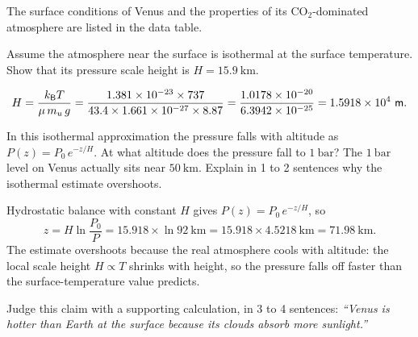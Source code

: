 
The surface conditions of Venus and the properties of its $\mathrm{CO_2}$-dominated atmosphere are listed in the data table.

\parti {} Assume the atmosphere near the surface is isothermal at the surface temperature.
Show that its pressure scale height is $H = 15.9\ \mathrm{km}$.

\begin{solution}
\[
  H = \frac{k_{\mathsf{B}} T}{\mu\, m_u\, g}
    = \frac{1.381 \times 10^{-23} \times 737}{43.4 \times 1.661 \times 10^{-27} \times 8.87}
    = \frac{1.0178 \times 10^{-20}}{6.3942 \times 10^{-25}}
    = 1.5918 \times 10^{4}\ \mathsf{m}.
\]
\end{solution}

\parti {} In this isothermal approximation the pressure falls with altitude as $P(z) = P_0\, e^{-z/H}$.
At what altitude does the pressure fall to $1\ \mathrm{bar}$?
The $1\ \mathrm{bar}$ level on Venus actually sits near $50\ \mathrm{km}$.
Explain in 1 to 2 sentences why the isothermal estimate overshoots.

\begin{solution}
Hydrostatic balance with constant $H$ gives $P(z) = P_0\, e^{-z/H}$, so
\[
  z = H \ln \frac{P_0}{P} = 15.918 \times \ln 92\ \mathrm{km} = 15.918 \times 4.5218\ \mathrm{km} = 71.98\ \mathrm{km}.
\]
The estimate overshoots because the real atmosphere cools with altitude: the local scale height $H \propto T$ shrinks with height, so the pressure falls off faster than the surface-temperature value predicts.
\end{solution}

\parti {} Judge this claim with a supporting calculation, in 3 to 4 sentences:
\emph{``Venus is hotter than Earth at the surface because its clouds absorb more sunlight.''}

